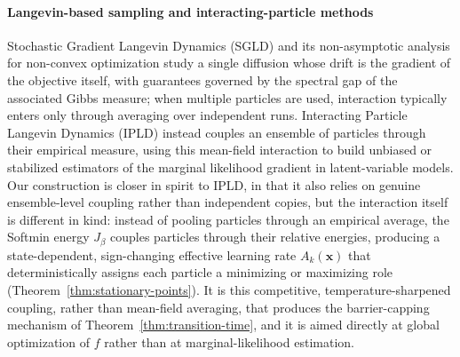 \documentclass{article} %
\theoremstyle{plain}
\theoremstyle{definition}
\theoremstyle{remark}
\newcommand{\prefactor}[2]{A_{#1}(#2)}
\newcommand{\xx}{\mathbf{x}}
\begin{document}
\paragraph{Langevin-based sampling and interacting-particle methods}
Stochastic Gradient Langevin Dynamics (SGLD) \citep{welling2011bayesian} and its non-asymptotic analysis for non-convex optimization \citep{raginsky2017nonconvex} study a single diffusion whose drift is the gradient of the objective itself, with guarantees governed by the spectral gap of the associated Gibbs measure; when multiple particles are used, interaction typically enters only through averaging over independent runs. Interacting Particle Langevin Dynamics (IPLD) \citep{akyildiz2025interacting, encinar2025proximal} instead couples an ensemble of particles through their empirical measure, using this mean-field interaction to build unbiased or stabilized estimators of the marginal likelihood gradient in latent-variable models. Our construction is closer in spirit to IPLD, in that it also relies on genuine ensemble-level coupling rather than independent copies, but the interaction itself is different in kind: instead of pooling particles through an empirical average, the Softmin energy $J_\beta$ couples particles through their relative energies, producing a state-dependent, sign-changing effective learning rate $\prefactor{k}{\xx}$ that deterministically assigns each particle a minimizing or maximizing role (Theorem~\ref{thm:stationary-points}). It is this competitive, temperature-sharpened coupling, rather than mean-field averaging, that produces the barrier-capping mechanism of Theorem~\ref{thm:transition-time}, and it is aimed directly at global optimization of $f$ rather than at marginal-likelihood estimation.
\end{document}
